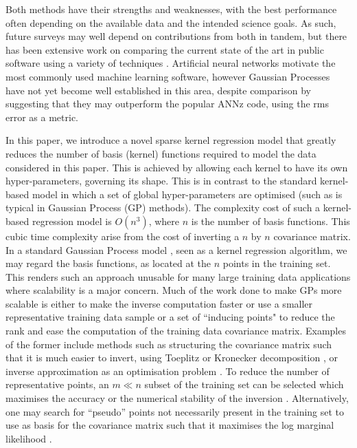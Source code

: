 \documentclass[useAMS,usenatbib,fleqn]{mn2e}
\begin{document}
Both methods have their strengths and weaknesses, with the best performance often depending on the available data and the intended science goals. As such, future surveys may well depend on contributions from both in tandem, but there has been extensive work on comparing the current state of the art in public software using a variety of techniques \citep{hildebrandt10,abdalla11,sanchez14}. Artificial neural networks motivate the most commonly used machine learning software, however Gaussian Processes \citep[e.g.][]{Way2009} have not yet become well established in this area, despite comparison by \citet{bonfield10} suggesting that they may outperform the popular ANNz code, using the rms error as a metric. 


In this paper, we introduce a novel sparse kernel regression model that greatly reduces the number of basis (kernel) functions required to model the data considered in this paper. This is achieved by allowing each kernel to have its own hyper-parameters, governing its shape. This is in contrast to the standard kernel-based model in which a set of global hyper-parameters are optimised (such as is typical in Gaussian Process (GP) methods). The complexity cost of such a kernel-based regression model is $O\left(n^{3}\right)$, where $n$ is the number of basis functions. This cubic time complexity arise from the cost of inverting a $n$ by $n$ covariance matrix. In a standard Gaussian Process model \citep{rasmussen2006gaussian}, seen as a kernel regression algorithm, we may regard the basis functions, as located at the $n$ points in the training set. This renders such an approach unusable for many large training data applications where scalability is a major concern. Much of the work done to make GPs more scalable is either to make the inverse computation faster or use a smaller representative training data sample or a set of ``inducing points" to reduce the rank and ease the computation of the training data covariance matrix. Examples of the former include methods such as structuring the covariance matrix such that it is much easier to invert, using Toeplitz  \citep{zhang2005time} or Kronecker decomposition \citep{tsiligkaridis2013}, or inverse approximation as an optimisation problem \citep{gibbs97}. To reduce the number of representative points, an $m \ll n$ subset of the training set can be selected which maximises the accuracy or the numerical stability of the inversion \citep{foster2009}. Alternatively, one may search for ``pseudo'' points not necessarily present in the training set to use as basis for the covariance matrix such that it maximises the log marginal likelihood \citep{snelson2005}. 
\end{document}

